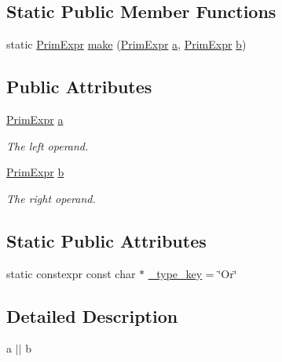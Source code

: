 \subsection*{Static Public Member Functions}
\begin{DoxyCompactItemize}
\item 
static \hyperlink{classtvm_1_1PrimExpr}{Prim\+Expr} \hyperlink{classtvm_1_1tir_1_1OrNode_a0f7867f76a1685e21712033932e8f4a5}{make} (\hyperlink{classtvm_1_1PrimExpr}{Prim\+Expr} \hyperlink{classtvm_1_1tir_1_1OrNode_a61302dc15e752bbde390bdba6c5de3a8}{a}, \hyperlink{classtvm_1_1PrimExpr}{Prim\+Expr} \hyperlink{classtvm_1_1tir_1_1OrNode_a37326d054944087da18aca83cd3570e9}{b})
\end{DoxyCompactItemize}
\subsection*{Public Attributes}
\begin{DoxyCompactItemize}
\item 
\hyperlink{classtvm_1_1PrimExpr}{Prim\+Expr} \hyperlink{classtvm_1_1tir_1_1OrNode_a61302dc15e752bbde390bdba6c5de3a8}{a}
\begin{DoxyCompactList}\small\item\em The left operand. \end{DoxyCompactList}\item 
\hyperlink{classtvm_1_1PrimExpr}{Prim\+Expr} \hyperlink{classtvm_1_1tir_1_1OrNode_a37326d054944087da18aca83cd3570e9}{b}
\begin{DoxyCompactList}\small\item\em The right operand. \end{DoxyCompactList}\end{DoxyCompactItemize}
\subsection*{Static Public Attributes}
\begin{DoxyCompactItemize}
\item 
static constexpr const char $\ast$ \hyperlink{classtvm_1_1tir_1_1OrNode_a9c0985de2d00800a2745ffda44b6e4a9}{\+\_\+type\+\_\+key} = \char`\"{}Or\char`\"{}
\end{DoxyCompactItemize}


\subsection{Detailed Description}
a $\vert$$\vert$ b 

